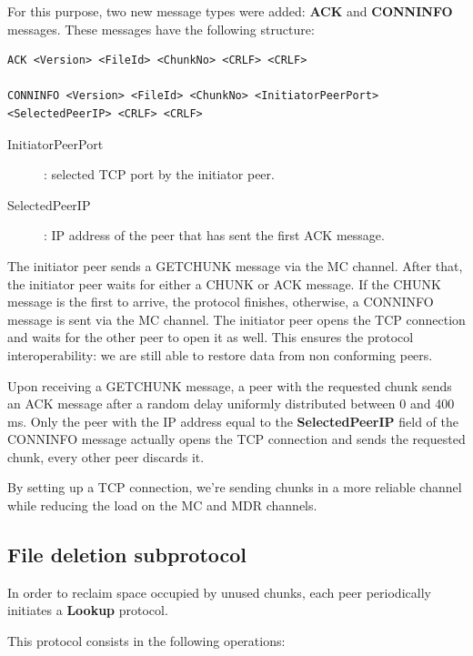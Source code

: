 \documentclass[a4paper]{article}
\begin{document}
For this purpose, two new message types were added: \textbf{ACK} and \textbf{CONNINFO} messages. These messages have the following structure:

\begin{verbatim}
ACK <Version> <FileId> <ChunkNo> <CRLF> <CRLF>

CONNINFO <Version> <FileId> <ChunkNo> <InitiatorPeerPort>
<SelectedPeerIP> <CRLF> <CRLF>
\end{verbatim}

\begin{description}
\item[InitiatorPeerPort]: selected TCP port by the initiator peer.
\item[SelectedPeerIP]: IP address of the peer that has sent the first ACK message.
\end{description}

The initiator peer sends a GETCHUNK message via the MC channel. After that, the initiator peer waits for either a CHUNK or ACK message. If the CHUNK message is the first to arrive, the protocol finishes, otherwise, a CONNINFO message is sent via the MC channel. The initiator peer opens the TCP connection and waits for the other peer to open it as well. This ensures the protocol interoperability: we are still able to restore data from non conforming peers.

Upon receiving a GETCHUNK message, a peer with the requested chunk sends an ACK message after a random delay uniformly distributed between 0 and 400 ms.
Only the peer with the IP address equal to the \textbf{SelectedPeerIP} field of the CONNINFO message actually opens the TCP connection and sends the requested chunk, every other peer discards it.

By setting up a TCP connection, we're sending chunks in a more reliable channel while reducing the load on the MC and MDR channels.
\newpage

\subsection{File deletion subprotocol}

In order to reclaim space occupied by unused chunks, each peer periodically initiates a \textbf{Lookup} protocol.

This protocol consists in the following operations:
\end{document}

